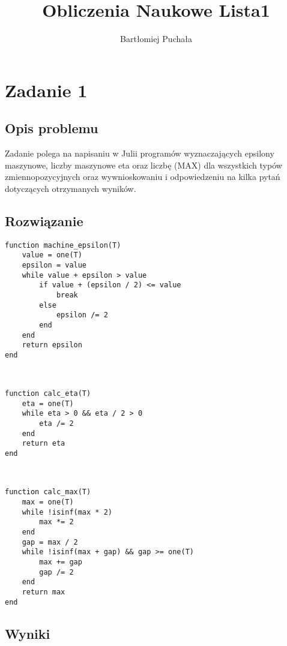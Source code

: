 \documentclass[11pt]{article}
\title{Obliczenia Naukowe Lista1}
\author{Bartłomiej Puchała }
\begin{document}
\maketitle

\section{Zadanie 1}
\subsection{Opis problemu}
Zadanie polega na napisaniu w Julii programów wyznaczających epsilony maszynowe, liczby maszynowe eta oraz liczbę (MAX) dla wszystkich typów zmiennopozycyjnych oraz wywnioskowaniu i odpowiedzeniu na kilka pytań dotyczących otrzymanych wyników.
\subsection{Rozwiązanie}
\begin{verbatim}
function machine_epsilon(T) 
    value = one(T)
    epsilon = value
    while value + epsilon > value
        if value + (epsilon / 2) <= value
            break
        else
            epsilon /= 2
        end
    end
    return epsilon
end
\end{verbatim} \\
\begin{verbatim}
function calc_eta(T)
    eta = one(T)
    while eta > 0 && eta / 2 > 0
        eta /= 2
    end
    return eta
end
\end{verbatim} \\
\begin{verbatim}
function calc_max(T)
    max = one(T)
    while !isinf(max * 2)
        max *= 2
    end
    gap = max / 2
    while !isinf(max + gap) && gap >= one(T)
        max += gap
        gap /= 2
    end
    return max
end
\end{verbatim}
\subsection{Wyniki}
\end{document}
